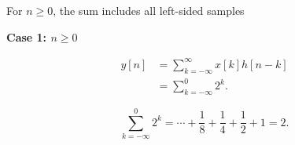 \documentclass[aspectratio=169,11pt]{beamer}
\newcommand{\CardTitleSize}{\large}
\newcommand{\CardTitle}[1]{%
  \vspace{0.15cm}
  {\CardTitleSize\bfseries #1}\par
}
\begin{document}
\begin{frame}{For \(n\ge 0\), the sum includes all left-sided samples}

\begin{center}
\begin{OrangeCard}[
  width=0.88\textwidth,
  halign=center,
  top=12pt,
  bottom=12pt
]
\CardTitle{Case 1: \(n\ge 0\)}

\vspace{0.08cm}

\[
\begin{aligned}
y[n]
&=
\sum_{k=-\infty}^{\infty}x[k]h[n-k]\\[3pt]
&=
\sum_{k=-\infty}^{0}2^k.
\end{aligned}
\]

\vspace{0.10cm}

\[
\sum_{k=-\infty}^{0}2^k
=
\cdots+\frac{1}{8}+\frac{1}{4}+\frac{1}{2}+1
=
2.
\]



\end{OrangeCard}
\end{center}

\end{frame}
\end{document}
